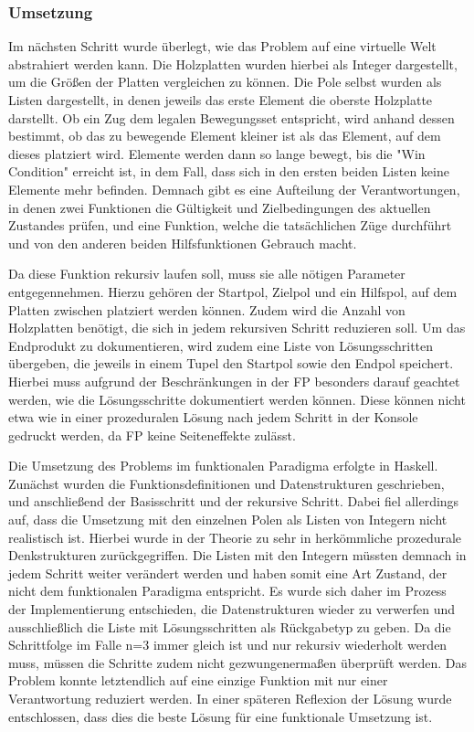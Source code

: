 \subsubsection{Umsetzung}
Im nächsten Schritt wurde überlegt, wie das Problem auf eine virtuelle Welt abstrahiert werden kann. Die Holzplatten wurden hierbei als Integer dargestellt, um die Größen der Platten vergleichen zu können. Die Pole selbst wurden als Listen dargestellt, in denen jeweils das erste Element die oberste Holzplatte darstellt.
Ob ein Zug dem legalen Bewegungsset entspricht, wird anhand dessen bestimmt, ob das zu bewegende Element kleiner ist als das Element, auf dem dieses platziert wird. Elemente werden dann so lange bewegt, bis die "Win Condition" erreicht ist, in dem Fall, dass sich in den ersten beiden Listen keine Elemente mehr befinden.
Demnach gibt es eine Aufteilung der Verantwortungen, in denen zwei Funktionen die Gültigkeit und Zielbedingungen des aktuellen Zustandes prüfen, und eine Funktion, welche die tatsächlichen Züge durchführt und von den anderen beiden Hilfsfunktionen Gebrauch macht.

Da diese Funktion rekursiv laufen soll, muss sie alle nötigen Parameter entgegennehmen. Hierzu gehören der Startpol, Zielpol und ein Hilfspol, auf dem Platten zwischen platziert werden können. Zudem wird die Anzahl von Holzplatten benötigt, die sich in jedem rekursiven Schritt reduzieren soll.
Um das Endprodukt zu dokumentieren, wird zudem eine Liste von Lösungsschritten übergeben, die jeweils in einem Tupel den Startpol sowie den Endpol speichert. Hierbei muss aufgrund der Beschränkungen in der FP besonders darauf geachtet werden, wie die Lösungsschritte dokumentiert werden können. Diese können nicht etwa wie in einer prozeduralen Lösung nach jedem Schritt in der Konsole gedruckt werden, da FP keine Seiteneffekte zulässt.

Die Umsetzung des Problems im funktionalen Paradigma erfolgte in Haskell. Zunächst wurden die Funktionsdefinitionen und Datenstrukturen geschrieben, und anschließend der Basisschritt und der rekursive Schritt.
Dabei fiel allerdings auf, dass die Umsetzung mit den einzelnen Polen als Listen von Integern nicht realistisch ist. Hierbei wurde in der Theorie zu sehr in herkömmliche prozedurale Denkstrukturen zurückgegriffen. Die Listen mit den Integern müssten demnach in jedem Schritt weiter verändert werden und haben somit eine Art Zustand, der nicht dem funktionalen Paradigma entspricht. Es wurde sich daher im Prozess der Implementierung entschieden, die Datenstrukturen wieder zu verwerfen und ausschließlich die Liste mit Lösungsschritten als Rückgabetyp zu geben. Da die Schrittfolge im Falle n=3 immer gleich ist und nur rekursiv wiederholt werden muss, müssen die Schritte zudem nicht gezwungenermaßen überprüft werden. Das Problem konnte letztendlich auf eine einzige Funktion mit nur einer Verantwortung reduziert werden. In einer späteren Reflexion der Lösung wurde entschlossen, dass dies die beste Lösung für eine funktionale Umsetzung ist.

